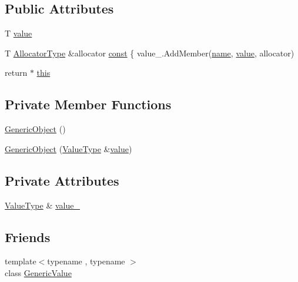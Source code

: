 \subsection*{Public Attributes}
\begin{DoxyCompactItemize}
\item 
T \hyperlink{classGenericObject_a131538fbbacbc0a3a5ad15dbea66394f}{value}
\item 
T \hyperlink{classGenericObject_a00c8cee952d5ebadc5e1c309aa489ad9}{Allocator\+Type} \&allocator \hyperlink{classGenericObject_af70c9646b5e422306c33e98b3d8783a7}{const} \{ value\+\_\+.\+Add\+Member(\hyperlink{imgui__impl__opengl3__loader_8h_a5c4947d4516dd7cfa3505ce3a648a4ef}{name}, \hyperlink{imgui__impl__opengl3__loader_8h_a32aff7c6c4cd253fdf6563677afab5ce}{value}, allocator)
\item 
return $\ast$ \hyperlink{classGenericObject_a719a0e5501da825e6f86ce12b46446cb}{this}
\end{DoxyCompactItemize}
\subsection*{Private Member Functions}
\begin{DoxyCompactItemize}
\item 
\hyperlink{classGenericObject_a4bd854dbe7168cf81541fad6fd9d9f12}{Generic\+Object} ()
\item 
\hyperlink{classGenericObject_a56600535a7936f35f53973e358cd4731}{Generic\+Object} (\hyperlink{classGenericObject_a930aa30f89caee7ba7bff60bf9dc21b1}{Value\+Type} \&\hyperlink{imgui__impl__opengl3__loader_8h_a32aff7c6c4cd253fdf6563677afab5ce}{value})
\end{DoxyCompactItemize}
\subsection*{Private Attributes}
\begin{DoxyCompactItemize}
\item 
\hyperlink{classGenericObject_a930aa30f89caee7ba7bff60bf9dc21b1}{Value\+Type} \& \hyperlink{classGenericObject_a2578a62ca4786f6fb056400138623473}{value\+\_\+}
\end{DoxyCompactItemize}
\subsection*{Friends}
\begin{DoxyCompactItemize}
\item 
{\footnotesize template$<$typename , typename $>$ }\\class \hyperlink{classGenericObject_a899449e1a645b5e377af059fb61113d8}{Generic\+Value}
\end{DoxyCompactItemize}


